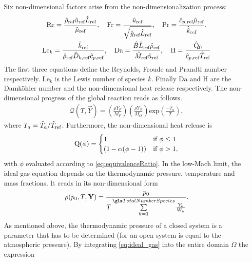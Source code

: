 Six non-dimensional factors arise from the non-dimensionalization process:
\begin{gather*}
	\text{Re} = \frac{\RefVal{\rho} \RefVal{u}  \RefVal{L}}{\RefVal{\Viscosity}}, \quad
	\text{Fr} = \frac{\RefVal{u}}{\sqrt{\RefVal{g}\RefVal{L}}}, \quad
	\text{Pr} = \frac{\RefValS{c}{p} \RefVal{\Viscosity}}{\RefVal{k}},\\%
	\text{Le}_k = \frac{\RefVal{k}}{\RefVal{\rho} \RefValS{D}{k} \RefValS{c}{p}}, \quad
	\Da = \frac{\hat B \RefVal{L} \RefVal{\rho}}{\RefVal{M}\RefVal{u}}, \quad \label{eq:Dahmkoeler}
	\text{H} = \frac{\hat \heatRelease_0}{\RefValS{c}{p} \RefVal{T}}%
\end{gather*}
The first three equations define the Reynolds, Froude and Prandtl number respectively. $\text{Le}_k$ is the Lewis number of species $k$. Finally $\text{Da}$ and H are the Damköhler number and the non-dimensional heat release respectively. The non-dimensional progress of the global reaction reads as follows.
\begin{align}
	\mathcal{Q}(T, \vec{Y})  = \left(\frac{\rho Y_F}{M_F}\right) \left(\frac{\rho Y_O}{M_O}\right)\text{exp}\left(\frac{-T_a}{T}\right), \label{eq:NonDimArr}
\end{align}
where $T_a = \hat{T}_a / \hat T_{\text{ref}}$. Furthermore, the non-dimensional heat release is
\begin{equation}
	\mathrm{Q}(\phi)=
	\begin{cases}
		1                     & \text{if}~ \phi \leq 1 \\
		(1 - \alpha(\phi -1)) & \text{if}~\phi > 1,
	\end{cases}  \label{eq:heatReleaseOneStepNonDim}
\end{equation}
with $\phi$ evaluated according to \cref{eq:equivalenceRatio}. In the low-Mach limit, the ideal gas equation depends on the thermodynamic pressure, temperature and mass fractions. It reads in its non-dimensional form
\begin{align} \label{eq:ideal_gas}
	\rho(p_0,T, \vec{Y}) = \frac{p_0}{T \SumOvAllns \frac{Y_k}{W_k}}.
\end{align}
As mentioned above, the thermodynamic pressure of a closed system is a parameter that has to be determined (for an open system is equal to the atmospheric pressure). By integrating \cref{eq:ideal_gas} into the entire domain $\Omega$ the expression
